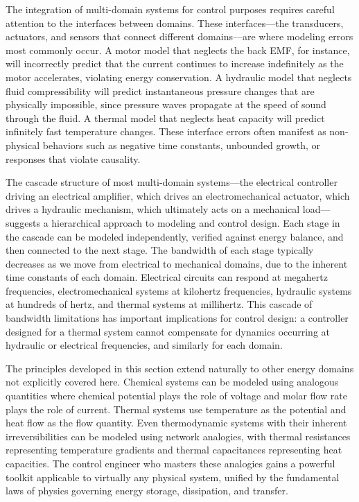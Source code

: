 The integration of multi-domain systems for control purposes requires careful attention to the interfaces between domains. These interfaces—the transducers, actuators, and sensors that connect different domains—are where modeling errors most commonly occur. A motor model that neglects the back EMF, for instance, will incorrectly predict that the current continues to increase indefinitely as the motor accelerates, violating energy conservation. A hydraulic model that neglects fluid compressibility will predict instantaneous pressure changes that are physically impossible, since pressure waves propagate at the speed of sound through the fluid. A thermal model that neglects heat capacity will predict infinitely fast temperature changes. These interface errors often manifest as non-physical behaviors such as negative time constants, unbounded growth, or responses that violate causality.

The cascade structure of most multi-domain systems—the electrical controller driving an electrical amplifier, which drives an electromechanical actuator, which drives a hydraulic mechanism, which ultimately acts on a mechanical load—suggests a hierarchical approach to modeling and control design. Each stage in the cascade can be modeled independently, verified against energy balance, and then connected to the next stage. The bandwidth of each stage typically decreases as we move from electrical to mechanical domains, due to the inherent time constants of each domain. Electrical circuits can respond at megahertz frequencies, electromechanical systems at kilohertz frequencies, hydraulic systems at hundreds of hertz, and thermal systems at millihertz. This cascade of bandwidth limitations has important implications for control design: a controller designed for a thermal system cannot compensate for dynamics occurring at hydraulic or electrical frequencies, and similarly for each domain.

The principles developed in this section extend naturally to other energy domains not explicitly covered here. Chemical systems can be modeled using analogous quantities where chemical potential plays the role of voltage and molar flow rate plays the role of current. Thermal systems use temperature as the potential and heat flow as the flow quantity. Even thermodynamic systems with their inherent irreversibilities can be modeled using network analogies, with thermal resistances representing temperature gradients and thermal capacitances representing heat capacities. The control engineer who masters these analogies gains a powerful toolkit applicable to virtually any physical system, unified by the fundamental laws of physics governing energy storage, dissipation, and transfer.

